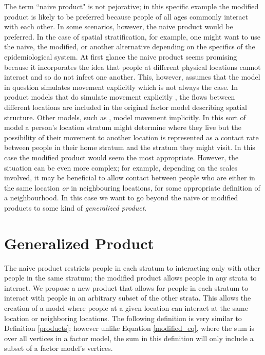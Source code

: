 \documentclass[pdflatex,sn-basic]{sn-jnl}%
\theoremstyle{definition}
\newcommand{\define}[1]{\emph{{#1}}}
\begin{document}
\FloatBarrier
The term “naive product" is not pejorative; in this specific example the modified product is likely to be preferred because people of all ages commonly interact with each other. In some scenarios, however, the naive product would be preferred. In the case of spatial stratification, for example, one might want to use the naive, the modified, or another alternative depending on the specifics of the epidemiological system. At first glance the naive product seems promising because it incorporates the idea that people at different physical locations cannot interact and so do not infect one another. This, however, assumes that the model in question simulates movement explicitly which is not always the case. In product models that do simulate movement explicitly \cite[e.g.][]{mohammadi2023importation}, the flows between different locations are included in the original factor model describing spatial structure. Other models, such as \cite{dietz1995structured}, model movement implicitly. In this sort of model a person's location stratum might determine where they live but the possibility of their movement to another location is represented as a contact rate between people in their home stratum and the stratum they might visit. In this case the modified product would seem the most appropriate. However, the situation can be even more complex; for example, depending on the scales involved, it may be beneficial to allow contact between people who are either in the same location \emph{or} in neighbouring locations, for some appropriate definition of a neighbourhood. In this case we want to go beyond the naive or modified products to some kind of \define{generalized product}.

\section{Generalized Product}\label{general}
The naive product restricts people in each stratum to interacting only with other people in the same stratum; the modified product allows people in any strata to interact. We propose a new product that allows for people in each stratum to interact with people in an arbitrary subset of the other strata. This allows the creation of a model where people at a given location can interact at the same location or neighboring locations. The following definition is very similar to Definition \ref{products}; however unlike Equation \ref{modified_eq}, where the sum is over all vertices in a factor model, the sum in this definition will only include a subset of a factor model's vertices.
\end{document}
